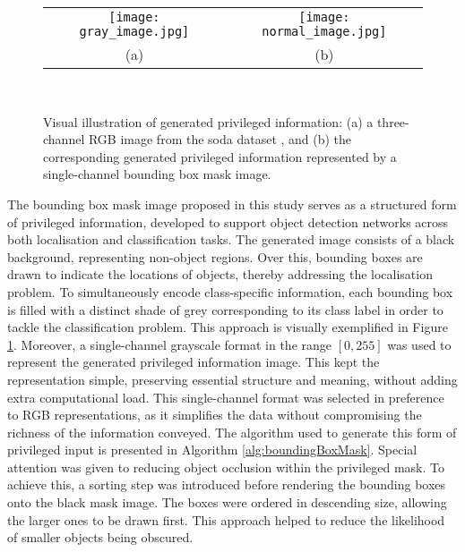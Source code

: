 \begin{figure}[!htbp]
  \centering
  \begin{tabular}{cc}
    \texttt{[image: gray\_image.jpg]} &
    \texttt{[image: normal\_image.jpg]} \\
    \small (a) & \small (b) \\
  \end{tabular}\\
  \caption{Visual illustration of generated privileged information: (a) a three-channel RGB image from the \gls{soda} dataset \cite{soda_dataset}, and (b) the corresponding generated privileged information represented by a single-channel bounding box mask image.}
  \label{fig:privileged_visual}
\end{figure}

The bounding box mask image proposed in this study serves as a structured form of privileged information, developed to support object detection networks across both localisation and classification tasks. The generated image consists of a black background, representing non-object regions. Over this, bounding boxes are drawn to indicate the locations of objects, thereby addressing the localisation problem. To simultaneously encode class-specific information, each bounding box is filled with a distinct shade of grey corresponding to its class label in order to tackle the classification problem. This approach is visually exemplified in Figure \ref{fig:privileged_visual}.
Moreover, a single-channel grayscale format in the range $[0, 255]$ was used to represent the generated privileged information image. This kept the representation simple, preserving essential structure and meaning, without adding extra computational load. This single-channel format was selected in preference to RGB representations, as it simplifies the data without compromising the richness of the information conveyed. The algorithm used to generate this form of privileged input is presented in Algorithm \ref{alg:boundingBoxMask}. Special attention was given to reducing object occlusion within the privileged mask. To achieve this, a sorting step was introduced before rendering the bounding boxes onto the black mask image. The boxes were ordered in descending size, allowing the larger ones to be drawn first. This approach helped to reduce the likelihood of smaller objects being obscured.

        
